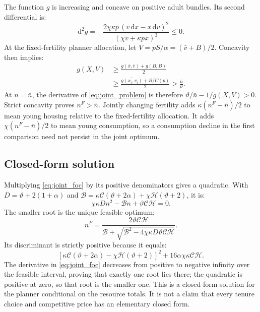 \documentclass[11pt]{article}
\newcommand{\dd}{\mathrm d}
\newcommand{\avg}[1]{\overline{#1}}
\begin{document}
The function $g$ is increasing and concave on positive adult bundles. Its
second differential is:
\begin{equation}
\dd^2g=-\frac{2\chi\kappa p\,(v\,\dd x-x\,\dd v)^2}
 {(\chi v+\kappa p x)^3}\le0.
\end{equation}
At the fixed-fertility planner allocation, let
$V=pS/\alpha=(\bar v+B)/2$. Concavity then implies:
\begin{equation}
\begin{split}
g(X,V)
 &\ge\frac{g(\bar x,\bar v)+g(B,B)}{2}\\
 &\ge\frac{\avg{g(x_i,v_i)}+B/C(p)}{2}
 >\frac{\bar n}{\vartheta}.
\end{split}
\label{eq:jensen}
\end{equation}
At $n=\bar n$, the derivative of \eqref{eq:joint_problem} is therefore
$\vartheta/\bar n-1/g(X,V)>0$. Strict concavity proves $n^F>\bar n$.
Jointly changing fertility adds $\kappa(n^F-\bar n)/2$ to mean young
housing relative to the fixed-fertility allocation. It adds
$\chi(n^F-\bar n)/2$ to mean young consumption, so a consumption decline
in the first comparison need not persist in the joint optimum.

\subsection{Closed-form solution}

Multiplying \eqref{eq:joint_foc} by its positive denominators gives a
quadratic. With $D=\vartheta+2(1+\alpha)$ and
$\mathcal B=\kappa\mathcal C(\vartheta+2\alpha)
+\chi\mathcal H(\vartheta+2)$, it is:
\begin{equation}
\chi\kappa Dn^2-\mathcal B n+\vartheta\mathcal C\mathcal H=0.
\end{equation}
The smaller root is the unique feasible optimum:
\begin{equation}
\boxed{n^F=
\frac{2\vartheta\mathcal C\mathcal H}
 {\mathcal B+\sqrt{\mathcal B^2
        -4\chi\kappa D\vartheta\mathcal C\mathcal H}}}.
\label{eq:fertility_root}
\end{equation}
Its discriminant is strictly positive because it equals:
\begin{equation}
\left[\kappa\mathcal C(\vartheta+2\alpha)
      -\chi\mathcal H(\vartheta+2)\right]^2
      +16\alpha\chi\kappa\mathcal C\mathcal H.
\end{equation}
The derivative in \eqref{eq:joint_foc} decreases from positive to negative
infinity over the feasible interval, proving that exactly one root lies
there; the quadratic is positive at zero, so that root is the smaller one.
This is a closed-form solution for the planner conditional on the resource
totals. It is not a claim that every tenure choice and competitive price has
an elementary closed form.
\end{document}
